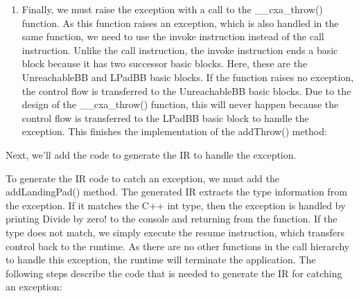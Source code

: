 \begin{enumerate}
\item
Finally, we must raise the exception with a call to the \_\_cxa\_throw() function. As this function raises an exception, which is also handled in the same function, we need to use the invoke instruction instead of the call instruction. Unlike the call instruction, the invoke instruction ends a basic block because it has two successor basic blocks. Here, these are the UnreachableBB and LPadBB basic blocks. If the function raises no exception, the control flow is transferred to the UnreachableBB basic blocks. Due to the design of the \_\_cxa\_throw() function, this will never happen because the control flow is transferred to the LPadBB basic block to handle the exception. This finishes the implementation of the addThrow() method:

\begin{cpp}
    Builder.CreateInvoke(
    ThrowEHFty, ThrowEHFn, UnreachableBB, LPadBB,
    {EH,
     ConstantExpr::getBitCast(TypeInfo, Int8PtrTy),
     ConstantPointerNull::get(Int8PtrTy)});
}
\end{cpp}

\end{enumerate}

Next, we’ll add the code to generate the IR to handle the exception.


To generate the IR code to catch an exception, we must add the addLandingPad() method. The generated IR extracts the type information from the exception. If it matches the C++ int type, then the exception is handled by printing Divide by zero! to the console and returning from the function. If the type does not match, we simply execute the resume instruction, which transfers control back to the runtime. As there are no other functions in the call hierarchy to handle this exception, the runtime will terminate the application. The following steps describe the code that is needed to generate the IR for catching an exception:

